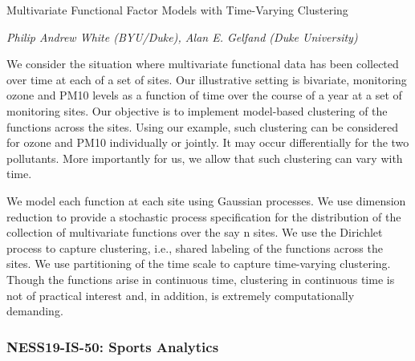 \begin{itemize}
Multivariate Functional Factor Models with Time-Varying Clustering

\emph{\footnotesize Philip Andrew White (BYU/Duke), Alan E. Gelfand (Duke University)}

We consider the situation where multivariate functional data has been collected over time at each of a set of sites. Our illustrative setting is bivariate, monitoring ozone and PM10 levels as a function of time over the course of a year at a set of monitoring sites. Our objective is to implement model-based clustering of the functions across the sites. Using our example, such clustering can be considered for ozone and PM10 individually or jointly. It may occur differentially for the two pollutants. More importantly for us, we allow that such clustering can vary with time.

We model each function at each site using Gaussian processes. We use dimension reduction to provide a stochastic process specification for the distribution of the collection of multivariate functions over the say n sites. We use the Dirichlet process to capture clustering, i.e., shared labeling of the functions across the sites. We use partitioning of the time scale to capture time-varying clustering. Though the functions arise in continuous time, clustering in continuous time is not of practical interest and, in addition, is extremely computationally demanding.

\end{itemize}

\subsubsection*{NESS19-IS-50: Sports Analytics}

